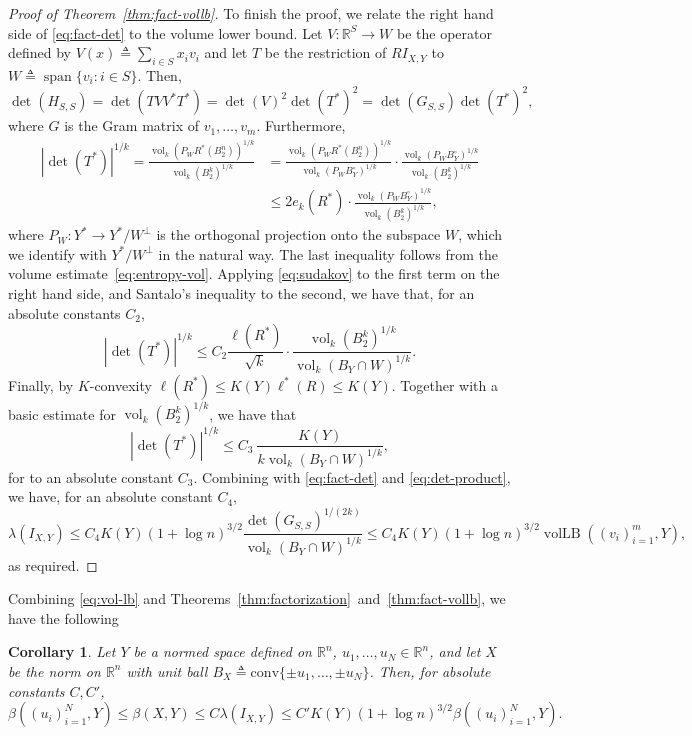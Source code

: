 \documentclass[12pt]{article}
\newtheorem{corollary}[theorem]{Corollary}
\newcommand{\R}{{\mathbb{R}}}
\newcommand{\eqdef}{\triangleq}
\DeclareMathOperator{\vollb}{volLB}
\DeclareMathOperator{\vol}{vol}
\DeclareMathOperator{\lspan}{span}
\begin{document}
\begin{proof}[Proof of Theorem~\ref{thm:fact-vollb}]
  To finish the proof, we relate the right hand side of
  \eqref{eq:fact-det} to the volume lower bound. Let $V:\R^S \to W$ be
  the operator defined by $V(x) \eqdef \sum_{i \in S}{x_i v_i}$ and let $T$
  be the restriction of $RI_{X,Y}$ to $W \eqdef \lspan\{v_i: i \in
  S\}$. Then, 
  \begin{equation}\label{eq:det-product}
  \det(H_{S,S}) = \det(TVV^*T^*) = \det(V)^2\det(T^*)^2 =
  \det(G_{S,S}) \det(T^*)^2,
  \end{equation}
  where $G$ is the Gram matrix of $v_1, \ldots, v_m$. Furthermore,
  \begin{align*}
  |\det(T^*)|^{1/k} =
  \frac{\vol_k(P_WR^*(B_2^n))^{1/k}}{\vol_k(B_2^k)^{1/k}}
  &= \frac{\vol_k(P_WR^*(B_2^n))^{1/k}}{\vol_k(P_WB_Y^\circ)^{1/k}} \cdot 
  \frac{\vol_k(P_WB_Y^\circ)^{1/k}}{\vol_k(B_2^k)^{1/k}}\\
  &\le 2e_k(R^*) \cdot 
  \frac{\vol_k(P_WB_Y^\circ)^{1/k}}{\vol_k(B_2^k)^{1/k}},
  \end{align*}
  where $P_W:Y^* \to Y^*/W^\perp$ is the orthogonal projection onto
  the subspace $W$, which we identify with $Y^*/W^\perp$ in the natural
  way. The last inequality follows from the volume
  estimate~\eqref{eq:entropy-vol}. Applying \eqref{eq:sudakov} to the
  first term on the right hand side, and Santalo's inequality to the
  second, we have that, for an absolute constants $C_2$,
  \[
  |\det(T^*)|^{1/k} \le C_2 \frac{\ell(R^*)}{\sqrt{k}} \cdot
  \frac{\vol_k(B_2^k)^{1/k}}{\vol_k(B_Y \cap W)^{1/k}}. 
  \]
  Finally, by $K$-convexity $\ell(R^*) \le K(Y) \ell^*(R) \le
  K(Y)$. Together with a basic estimate for $\vol_k(B_2^k)^{1/k}$, we
  have that 
  \[
  |\det(T^*)|^{1/k} \le C_3\ \frac{K(Y)}{k\vol_k(B_Y \cap W)^{1/k}},
  \]
  for to an absolute constant $C_3$. Combining with \eqref{eq:fact-det} and
  \eqref{eq:det-product}, we have, for an absolute constant $C_4$,
  \[
  \lambda(I_{X,Y}) \le C_4K(Y) (1+\log n)^{3/2}  
  \frac{\det(G_{S,S})^{1/(2k)}}{\vol_k(B_Y \cap W)^{1/k}}
  \le C_4 K(Y) (1+\log n)^{3/2}  
  \vollb((v_i)_{i =  1}^m, Y),
  \]
  as required.
\end{proof}

Combining \eqref{eq:vol-lb} and
Theorems~\ref{thm:factorization}~and~\ref{thm:fact-vollb},
we have the following

\begin{corollary}
  Let $Y$ be a normed space defined on $\R^n$, $u_1, \ldots, u_N \in
  \R^n$, and let $X$ be the norm on $\R^n$ with unit ball $B_X
  \eqdef\mathrm{conv}\{\pm u_1, \ldots, \pm u_N\}$. Then, for absolute
  constants $C, C'$,
  \[
  \beta((u_i)_{i = 1}^N, Y) \le \beta(X,Y)
  \le C \lambda(I_{X,Y})
  \le C' K(Y) (1+\log n)^{3/2}  \beta((u_i)_{i = 1}^N, Y).
  \]
\end{corollary}



\end{document}
